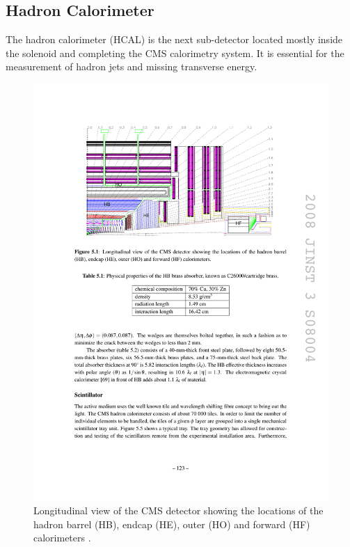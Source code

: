 \subsection{Hadron Calorimeter}

The hadron calorimeter (HCAL) is the next sub-detector located mostly inside the solenoid and completing the CMS
calorimetry system. It is essential for the measurement of hadron jets and missing transverse energy.

\begin{figure}[htbp]
  \centering
  \leavevmode
  \includegraphics[width=\columnwidth]{HCAL}
  \caption[Longitudinal view of the CMS detector]{Longitudinal view of the CMS detector showing the locations of the
  hadron barrel (HB), endcap (HE), outer (HO) and forward (HF) calorimeters \autocite{CMS}.}
  \label{fig:HCAL}
\end{figure}

